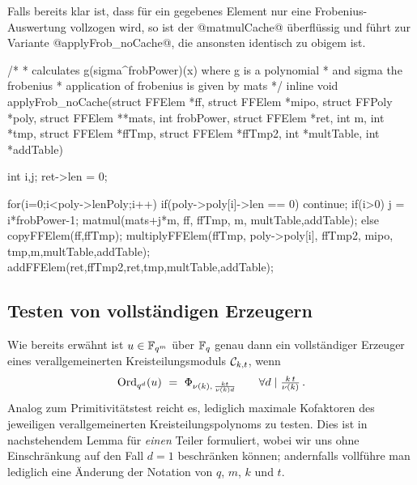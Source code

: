 Falls bereits klar ist, dass für ein gegebenes Element nur eine
Frobenius-Auswertung vollzogen wird, so ist der @matmulCache@ überflüssig und
führt zur Variante @applyFrob_noCache@, die ansonsten identisch zu obigem ist.

\begin{ccode}[caption={Aus \url{../Sage/enumeratePCNs.c}},
  firstnumber=827, label=lst:applyFrob_noCache]
/*
 * calculates g(sigma^frobPower)(x) where g is a polynomial 
 * and sigma the frobenius
 * application of frobenius is given by mats
 */
inline void applyFrob_noCache(struct FFElem *ff, struct FFElem *mipo,
        struct FFPoly *poly,
        struct FFElem **mats,
        int frobPower, struct FFElem *ret, 
        int m, int *tmp, struct FFElem *ffTmp, struct FFElem *ffTmp2,
        int *multTable, int *addTable){
    int i,j;
    ret->len = 0;
    
    for(i=0;i<poly->lenPoly;i++){
        if(poly->poly[i]->len == 0) continue;
        if(i>0){
            j = i*frobPower-1;
            matmul(mats+j*m, ff, ffTmp, m, multTable,addTable);
        }else{
            copyFFElem(ff,ffTmp);
        }
        multiplyFFElem(ffTmp, poly->poly[i],
                ffTmp2, mipo,
                tmp,m,multTable,addTable);
        addFFElem(ret,ffTmp2,ret,tmp,multTable,addTable);
    }
}
\end{ccode}


\subsection{Testen von vollständigen Erzeugern}

Wie bereits erwähnt ist $u\in \mathbb{F}_{q^m}$ über $\mathbb{F}_q$ genau dann ein vollständiger
Erzeuger eines verallgemeinerten Kreisteilungsmoduls $\mathcal{C}_{k,t}$, wenn
\[ \operatorname{Ord}_{q^d}(u) \ =\  \Phi_{\nu(k),\, \frac{kt}{\nu(k)d}} \qquad
  \forall d\mid \tfrac{k\,t}{\nu(k)}\,.\]
Analog zum Primitivitätstest reicht es, lediglich maximale Kofaktoren des
jeweiligen verallgemeinerten Kreisteilungspolynoms zu testen. 
Dies ist in nachstehendem Lemma für \emph{einen} Teiler
formuliert, wobei wir uns ohne Einschränkung
auf den Fall $d=1$ beschränken können; andernfalls vollführe man lediglich eine
Änderung der Notation von $q$, $m$, $k$ und $t$.

